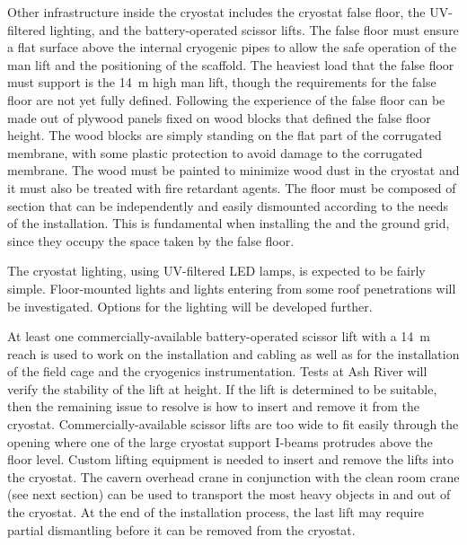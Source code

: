 Other infrastructure inside the cryostat includes the cryostat false floor, the UV-filtered lighting, and the battery-operated scissor lifts.
The false floor must ensure a flat surface above the internal cryogenic pipes to allow the safe operation of the man lift and the positioning of the scaffold.
The heaviest load that the false floor must support is the 14~m high man lift, though the requirements for the false floor are not yet fully defined.
Following the experience of  the false floor can be made out of plywood panels fixed on wood blocks that defined the false floor height.
The wood blocks are simply standing on the flat part of the corrugated membrane, with some plastic protection to avoid damage to the corrugated membrane.
The wood must be painted to minimize wood dust in the cryostat and it must also be treated with fire retardant agents.
The floor must be composed of section that can be independently and easily dismounted according to the needs of the installation.
This is fundamental when installing the  and the ground grid, since they occupy the space taken by the false floor.

The cryostat lighting, using UV-filtered LED lamps, is expected to be fairly simple.
Floor-mounted lights and lights entering from some roof penetrations will be investigated.
Options for the lighting will be developed further.

At least one commercially-available battery-operated scissor lift with a 14~m reach is used to work on the  installation and cabling as well as for the installation of the field cage and the cryogenics instrumentation.
Tests at Ash River will verify the stability of the lift at height.
If the lift is determined to be suitable, then the remaining issue to resolve is how to insert and remove it from the cryostat.
Commercially-available scissor lifts are too wide to fit easily through the  opening where one of the large cryostat support I-beams protrudes above the floor level.
Custom lifting equipment is needed to insert and remove the lifts into the cryostat.
The cavern overhead crane in conjunction with the clean room crane (see next section) can be used to transport the most heavy objects in and out of the cryostat.
At the end of the installation process, the last lift may require partial dismantling before it can be removed from the cryostat.

